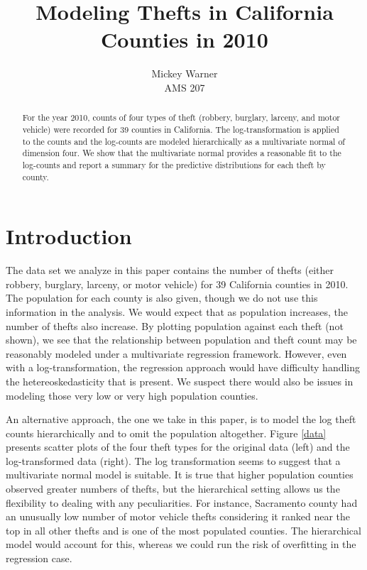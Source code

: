 \documentclass{asaproc}
\title{Modeling Thefts in California Counties in 2010}
\author{Mickey Warner \\ AMS 207}
\begin{document}
\maketitle


\begin{abstract}
For the year 2010, counts of four types of theft (robbery, burglary, larceny, and motor vehicle) were recorded for 39 counties in California. The log-transformation is applied to the counts and the log-counts are modeled hierarchically as a multivariate normal of dimension four. We show that the multivariate normal provides a reasonable fit to the log-counts and report a summary for the predictive distributions for each theft by county.
\end{abstract}

\section{Introduction}

The data set we analyze in this paper contains the number of thefts (either robbery, burglary, larceny, or motor vehicle) for 39 California counties in 2010. The population for each county is also given, though we do not use this information in the analysis. We would expect that as population increases, the number of thefts also increase. By plotting population against each theft (not shown), we see that the relationship between population and theft count may be reasonably modeled under a multivariate regression framework. However, even with a log-transformation, the regression approach would have difficulty handling the hetereoskedasticity that is present. We suspect there would also be issues in modeling those very low or very high population counties.

An alternative approach, the one we take in this paper, is to model the log theft counts hierarchically and to omit the population altogether. Figure \ref{data} presents scatter plots of the four theft types for the original data (left) and the log-transformed data (right). The log transformation seems to suggest that a multivariate normal model is suitable. It is true that higher population counties observed greater numbers of thefts, but the hierarchical setting allows us the flexibility to dealing with any peculiarities. For instance, Sacramento county had an unusually low number of motor vehicle thefts considering it ranked near the top in all other thefts and is one of the most populated counties. The hierarchical model would account for this, whereas we could run the risk of overfitting in the regression case.
\end{document}
